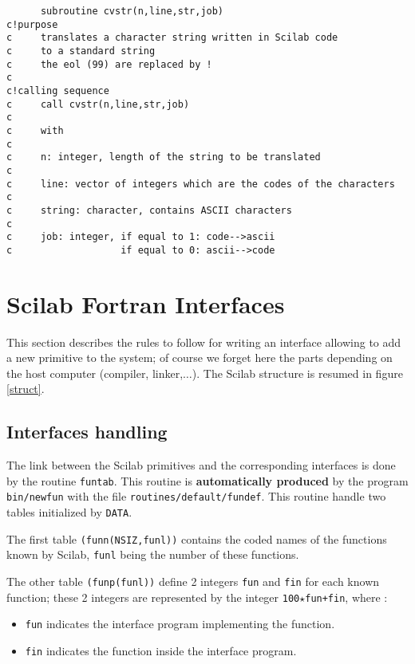 \begin{verbatim}
      subroutine cvstr(n,line,str,job)
c!purpose
c     translates a character string written in Scilab code
c     to a standard string
c     the eol (99) are replaced by !
c
c!calling sequence
c     call cvstr(n,line,str,job)
c
c     with
c
c     n: integer, length of the string to be translated
c
c     line: vector of integers which are the codes of the characters
c
c     string: character, contains ASCII characters
c
c     job: integer, if equal to 1: code-->ascii
c                   if equal to 0: ascii-->code
\end{verbatim}


\section{Scilab Fortran Interfaces}

This section describes the rules to follow for writing an interface
allowing to add a new primitive to the system; of course we forget here
the parts depending on the host computer (compiler, linker,$\ldots $).
The Scilab structure is resumed in figure  \ref{struct}.   

\subsection{Interfaces handling}

The link between the Scilab primitives and the corresponding interfaces
is done by the routine  {\tt funtab}. 
\label{funtab}
This routine is {\bf automatically produced} by the program {\tt bin/newfun}
with the file  {\tt routines/default/fundef}.\label{fundef}
This routine handle two tables initialized by {\tt   DATA}.

The first table {\tt (funn(NSIZ,funl))} contains the coded names of the 
functions known by Scilab, \verb!funl! being the number of these functions.

The other table {\tt (funp(funl))}  define 2 integers \verb!fun! and
\verb!fin! for each known function; these 2 integers are represented by the
integer {\tt 100}$\star${\tt fun+fin}, where :

\begin{itemize}

\item{\tt fun} indicates the interface program implementing the function.

\item{\tt fin} indicates the function inside the interface program.

\end{itemize}

